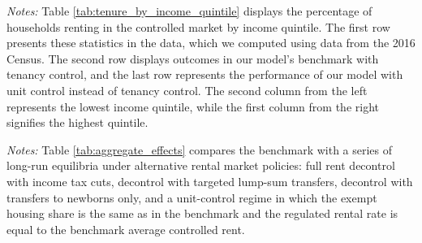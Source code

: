 \documentclass[parskip=full]{article}
\newenvironment{fignote2}[1]
{
\par
\medskip
\begin{minipage}{#1}
\footnotesize
}
{
\end{minipage}
}
\begin{document}
\begin{table}[H]
    \centering
    \caption{Households in controlled market by income quintile (all households)}
    \vspace{-0.5cm}
    \label{tab:tenure_by_income_quintile}     
    \vspace{-0.45cm}
    \begin{fignote2}{0.81\textwidth}
    \textit{Notes:} Table \ref{tab:tenure_by_income_quintile} displays the percentage of households renting in the controlled market by income quintile. The first row presents these statistics in the data, which we computed using data from the 2016 Census. The second row displays outcomes in our model's benchmark with tenancy control, and the last row represents the performance of our model with unit control instead of tenancy control. The second column from the left represents the lowest income quintile, while the first column from the right signifies the highest quintile.  
    \end{fignote2}
\end{table}

\begin{table}[H]
    \centering
    \caption{Aggregate effects generated by changes in rent-control policy}
    \vspace{-0.5cm}
    \label{tab:aggregate_effects}
    
    \vspace{-0.45cm}
    \begin{fignote2}{0.85\textwidth}
    \textit{Notes:} Table \ref{tab:aggregate_effects} compares the benchmark with a series of long-run equilibria under alternative rental market policies: full rent decontrol with income tax cuts, decontrol with targeted lump-sum transfers, decontrol with transfers to newborns only, and a unit-control regime in which the exempt housing share is the same as in the benchmark and the regulated rental rate is equal to the benchmark average controlled rent.
    \end{fignote2}
\end{table}
\end{document}
